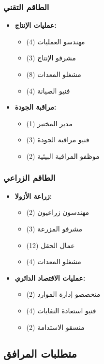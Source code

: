 \subsubsection{الطاقم التقني}
\begin{itemize}
    \item \textbf{عمليات الإنتاج:}
    \begin{itemize}
        \item مهندسو العمليات (4)
        \item مشرفو الإنتاج (3)
        \item مشغلو المعدات (8)
        \item فنيو الصيانة (4)
    \end{itemize}
    
    \item \textbf{مراقبة الجودة:}
    \begin{itemize}
        \item مدير المختبر (1)
        \item فنيو مراقبة الجودة (3)
        \item موظفو المراقبة البيئية (2)
    \end{itemize}
\end{itemize}

\subsubsection{الطاقم الزراعي}
\begin{itemize}
    \item \textbf{زراعة الأزولا:}
    \begin{itemize}
        \item مهندسون زراعيون (2)
        \item مشرفو المزرعة (3)
        \item عمال الحقل (12)
        \item مشغلو المعدات (4)
    \end{itemize}
    
    \item \textbf{عمليات الاقتصاد الدائري:}
    \begin{itemize}
        \item متخصصو إدارة الموارد (2)
        \item فنيو استعادة النفايات (4)
        \item منسقو الاستدامة (2)
    \end{itemize}
\end{itemize}

\subsection{متطلبات المرافق}

